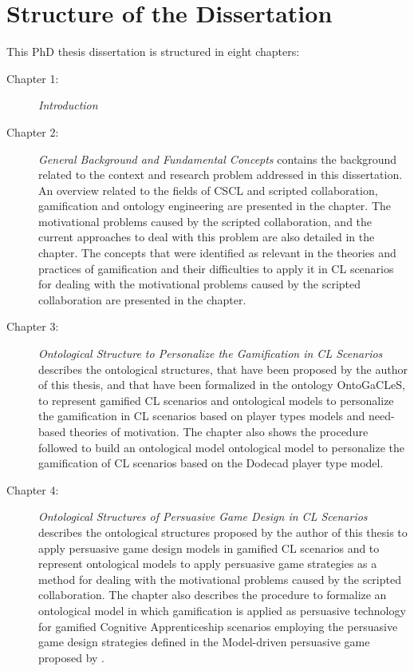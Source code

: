 \section{Structure of the Dissertation}
\label{sec:structure-of-dissertation}

This PhD thesis dissertation is structured in eight chapters:

\begin{description}

\item[Chapter 1:]
\emph{Introduction}

\item[Chapter 2:]
\emph{General Background and Fundamental Concepts}
contains the background related to the context and research problem addressed in this dissertation. An overview related to the fields of CSCL and scripted collaboration, gamification and ontology engineering are presented in the chapter. The motivational problems caused by the scripted collaboration, and the current approaches to deal with this problem are also detailed in the chapter. The concepts that were identified as relevant in the theories and practices of gamification and their difficulties to apply it in CL scenarios for dealing with the motivational problems caused by the scripted collaboration are presented in the chapter.

\item[Chapter 3:]
\emph{Ontological Structure to Personalize the Gamification in CL Scenarios} describes the ontological structures, that have been proposed by the author of this thesis, and that have been formalized in the ontology OntoGaCLeS, to represent gamified CL scenarios and ontological models to personalize the gamification in CL scenarios based on player types models and need-based theories of motivation. The chapter also shows the procedure followed to build an ontological model ontological model to personalize the gamification of CL scenarios based on the Dodecad player type model. 

\item[Chapter 4:]
\emph{Ontological Structures of Persuasive Game Design in CL Scenarios} describes the ontological structures proposed by the author of this thesis to apply persuasive game design models in gamified CL scenarios and to represent ontological models to apply persuasive game strategies as a method for dealing with the motivational problems caused by the scripted collaboration. The chapter also describes the procedure to formalize an ontological model in which gamification is applied as persuasive technology for gamified Cognitive Apprenticeship scenarios employing the persuasive game design strategies defined in the Model-driven persuasive game proposed by .


\end{description}
